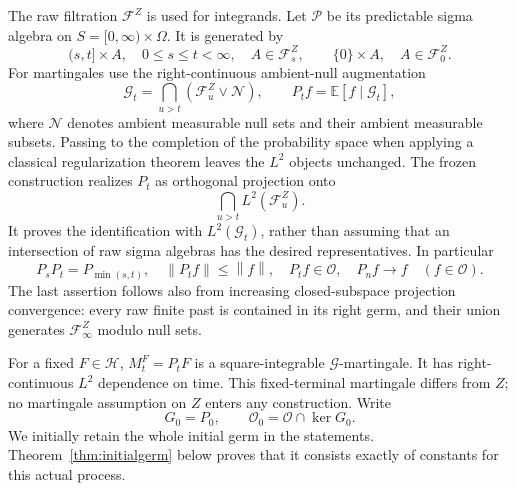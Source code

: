 \documentclass[11pt]{article}
\theoremstyle{remark}\newtheorem{remark}[theorem]{Remark}
\newcommand{\E}{\mathbb E}
\newcommand{\norm}[1]{\left\lVert#1\right\rVert}
\newcommand{\HH}{\mathcal H}
\newcommand{\OO}{\mathcal O}
\newcommand{\PP}{\mathcal P}
\begin{document}
The raw filtration $\mathcal F^Z$ is used for integrands. Let
$\PP$ be its predictable sigma algebra on
$S=[0,\infty)\times\Omega$. It is generated by
\begin{equation}\label{eq:rect}
 (s,t]\times A,\quad 0\leq s\leq t<\infty,
 \quad A\in\mathcal F_s^Z,
 \qquad \{0\}\times A,\quad A\in\mathcal F_0^Z.
\end{equation}
For martingales use the right-continuous ambient-null augmentation
\[
 \mathcal G_t=\bigcap_{u>t}(\mathcal F_u^Z\vee\mathcal N),
 \qquad P_t f=\E[f\mid\mathcal G_t],
\]
where $\mathcal N$ denotes ambient measurable null sets and their ambient
measurable subsets. Passing to the completion of the probability space
when applying a classical regularization theorem leaves the $L^2$
objects unchanged. The frozen construction realizes $P_t$ as orthogonal
projection onto
\[
 \bigcap_{u>t}L^2(\mathcal F_u^Z).
\]
It proves the identification with $L^2(\mathcal G_t)$, rather than
assuming that an intersection of raw sigma algebras has the desired
representatives. In particular
\begin{equation}\label{eq:projections}
 P_sP_t=P_{\min(s,t)},\quad \norm{P_tf}\leq\norm f,
 \quad P_tf\in\OO,\quad
 P_nf\longrightarrow f\quad(f\in\OO).
\end{equation}
The last assertion follows also from increasing closed-subspace
projection convergence: every raw finite past is contained in its right
germ, and their union generates $\mathcal F_\infty^Z$ modulo null sets.

For a fixed $F\in\HH$, $M_t^F=P_tF$ is a square-integrable
$\mathcal G$-martingale. It has right-continuous $L^2$ dependence on
time. This fixed-terminal martingale differs from $Z$; no martingale
assumption on $Z$ enters any construction. Write
\[
 G_0=P_0,\qquad \OO_0=\OO\cap\ker G_0.
\]
We initially retain the whole initial germ in the statements.
Theorem~\ref{thm:initialgerm} below proves that it consists exactly of
constants for this actual process.
\end{document}
